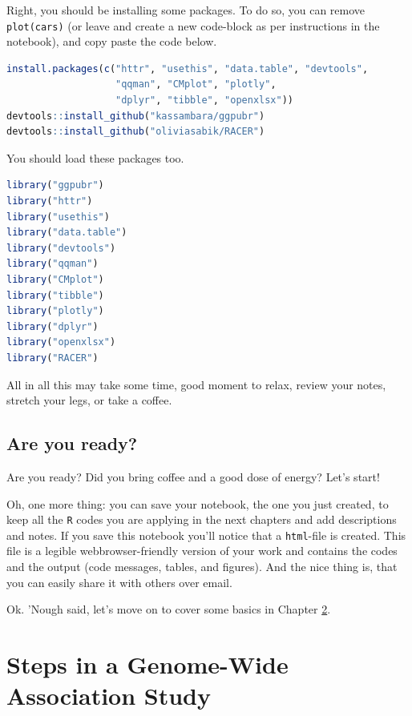 \documentclass[
]{book}
\newcommand{\passthrough}[1]{#1}
\begin{document}
Right, you should be installing some packages. To do so, you can remove \passthrough{\lstinline!plot(cars)!} (or leave and create a new code-block as per instructions in the notebook), and copy paste the code below.

\begin{lstlisting}[language=R]
install.packages(c("httr", "usethis", "data.table", "devtools", 
                   "qqman", "CMplot", "plotly", 
                   "dplyr", "tibble", "openxlsx"))
devtools::install_github("kassambara/ggpubr")
devtools::install_github("oliviasabik/RACER")
\end{lstlisting}

You should load these packages too.

\begin{lstlisting}[language=R]
library("ggpubr")
library("httr")
library("usethis")
library("data.table")
library("devtools")
library("qqman")
library("CMplot")
library("tibble")
library("plotly")
library("dplyr")
library("openxlsx")
library("RACER")
\end{lstlisting}

All in all this may take some time, good moment to relax, review your notes, stretch your legs, or take a coffee.

\hypertarget{are-you-ready}{%
\section{Are you ready?}\label{are-you-ready}}

Are you ready? Did you bring coffee and a good dose of energy? Let's start!

Oh, one more thing: you can save your notebook, the one you just created, to keep all the \passthrough{\lstinline!R!} codes you are applying in the next chapters and add descriptions and notes. If you save this notebook you'll notice that a \passthrough{\lstinline!html!}-file is created. This file is a legible webbrowser-friendly version of your work and contains the codes and the output (code messages, tables, and figures). And the nice thing is, that you can easily share it with others over email.

Ok. 'Nough said, let's move on to cover some basics in Chapter \ref{gwas-basics}.

\hypertarget{gwas-basics}{%
\chapter{Steps in a Genome-Wide Association Study}\label{gwas-basics}}
\end{document}
